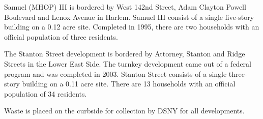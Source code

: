 \vspace{.7\baselineskip}Samuel (MHOP) III is bordered by West 142nd Street, Adam Clayton Powell Boulevard and Lenox Avenue in Harlem. Samuel III consist of a single five-story building  on a 0.12 acre site. Completed in 1995, there are two households with an official population of three residents.\par \vspace{.7\baselineskip}The Stanton Street development is bordered by Attorney, Stanton and Ridge Streets in the Lower East Side. The turnkey development came out of a federal program and was completed in 2003. Stanton Street consists of a single three-story building on a 0.11 acre site. There are 13 households with an official population of 34 residents.\par \vspace{.7\baselineskip}Waste is placed on the curbside for collection by DSNY for all developments.